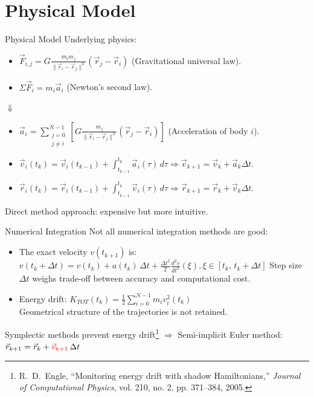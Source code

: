 \documentclass{beamer}
\begin{document}
\section{Physical Model}
\begin{frame}{Physical Model}
Underlying physics:
\begin{itemize}
	\item $\vec{F}_{i,j}=G\frac{m_{i} m_{j}}{\|\vec{r}_{i}-\vec{r}_{j}\|^3}(\vec{r}_{j}-\vec{r}_{i})$ (Gravitational universal law).
	\item $\Sigma\vec{F}_i = m_i\vec{a}_i$ (Newton's second law).
\end{itemize}
\begin{center}
	$\Downarrow$
\end{center}
\begin{itemize}
	\item $\vec{a}_i=\sum_{\substack{j=0 \\ j \neq i}}^{N-1}\left[G\frac{m_j}{\|\vec{r}_i-\vec{r}_j\|^3}(\vec{r}_j-\vec{r}_i)\right]$ (Acceleration of body $i$).
	\item $\vec{v}_i(t_k) = \vec{v}_i(t_{k-1}) + \int_{t_{k-1}}^{t_k} \vec{a}_i(\tau)\, d\tau \Rightarrow \vec{v}_{k+1}=\vec{v}_k+\vec{a}_k\Delta t$.
	\item $\vec{r}_i(t_k) = \vec{r}_i(t_{k-1}) + \int_{t_{k-1}}^{t_k} \vec{v}_i(\tau)\, d\tau \Rightarrow \vec{r}_{k+1}=\vec{r}_k+\vec{v}_k\Delta t$.
\end{itemize}
Direct method approach: expensive but more intuitive.
\end{frame}

\begin{frame}{Numerical Integration}
Not all numerical integration methods are good:
\begin{itemize}
	\item The exact velocity $v(t_{k+1})$ is: $v(t_k+\Delta t) = v(t_k) + a(t_k)\,\Delta t
+ \frac{\Delta t^2}{2} \frac{d^2 v}{dt^2}(\xi), \xi \in \left[ t_k,\, t_k+\Delta t \right]$
Step size $\Delta t$ weighs trade-off between accuracy and computational cost.
	\item Energy drift: $K_{TOT}(t_k) = \frac{1}{2} \sum_{i=0}^{N-1}m_iv_i^2(t_k)$
	\\Geometrical structure of the trajectories is not retained.
\end{itemize}
Symplectic methods prevent energy drift\footnote{R.~D.~Engle, “Monitoring energy drift with shadow Hamiltonians,” \emph{Journal of Computational Physics}, vol. 210, no. 2, pp. 371–384, 2005.} $\Rightarrow$ Semi-implicit Euler method: $\vec{r}_{k+1}=\vec{r}_k+\textcolor{red}{\vec{v}_{k+1}} \, \Delta t$
\end{frame}
\end{document}
